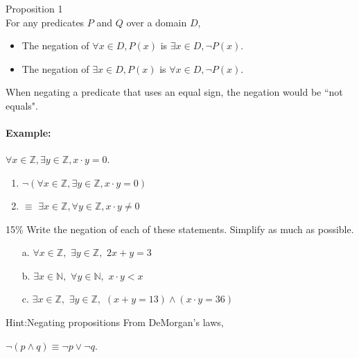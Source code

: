\documentclass[a4paper,12pt]{book}
\begin{document}
        \begin{intro}{Proposition 1\\}
        For any predicates $P$ and $Q$ over a domain $D$,
        \begin{itemize}
            \item The negation of $\forall x \in D, P(x)$ is $\exists x \in D, \neg P(x)$.
            \item The negation of $\exists x \in D, P(x)$ is $\forall x \in D, \neg P(x)$.
        \end{itemize}

        When negating a predicate that uses an equal sign, the negation would be ``not equals".

        \paragraph{Example:} $\forall x \in \mathbb{Z}, \exists y \in \mathbb{Z}, x \cdot y = 0$.
        \begin{enumerate}
            \item $\neg( \forall x \in \mathbb{Z}, \exists y \in \mathbb{Z}, x \cdot y = 0 )$
            \item $\equiv$ \tab $\exists x \in \mathbb{Z}, \forall y \in \mathbb{Z}, x \cdot y \neq 0$
        \end{enumerate}
        \end{intro}

    \newpage

        \begin{question}{5}{15\%}
            Write the negation of each of these statements. Simplify as much as possible.
        \end{question}

        \begin{enumerate}
            \item[a.] $\forall x \in \mathbb{Z},$ \tab[0.2cm] $\exists y \in \mathbb{Z},$ \tab[0.2cm] $2x+y = 3$
            \item[b.] $\exists x \in \mathbb{N},$ \tab[0.2cm] $\forall y \in \mathbb{N},$ \tab[0.2cm] $x \cdot y < x$
            \item[c.] $\exists x \in \mathbb{Z},$ \tab[0.2cm] $\exists y \in \mathbb{Z},$ \tab[0.2cm] $(x + y = 13) \land (x \cdot y = 36)$
        \end{enumerate}

        \begin{hint}{Hint:Negating propositions}
            From DeMorgan's laws,
            \begin{center}
                $\neg(p \land q) \equiv \neg p \lor \neg q$.
            \end{center} 
        \end{hint}
\end{document}
